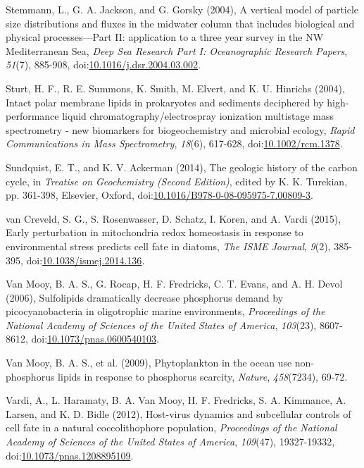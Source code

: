 \begin{singlespace}
{{Stemmann, L., G. A. Jackson, and G. Gorsky (2004), A vertical model of
particle size distributions and fluxes in the midwater column that
includes biological and physical processes---Part II: application to a
three year survey in the NW Mediterranean Sea, \emph{Deep Sea Research
Part I: Oceanographic Research Papers}, \emph{51}(7), 885-908,
doi:\href{http://dx.doi.org/10.1016/j.dsr.2004.03.002}{10.1016/j.dsr.2004.03.002}.

Sturt, H. F., R. E. Summons, K. Smith, M. Elvert, and K. U. Hinrichs
(2004), Intact polar membrane lipids in prokaryotes and sediments
deciphered by high-performance liquid chromatography/electrospray
ionization multistage mass spectrometry - new biomarkers for
biogeochemistry and microbial ecology, \emph{Rapid Communications in Mass Spectrometry}, \emph{18}(6), 617-628, doi:\href{http://dx.doi.org/10.1002/rcm.1378}{10.1002/rcm.1378}.

Sundquist, E. T., and K. V. Ackerman (2014), The geologic history of the carbon cycle, in \emph{Treatise on Geochemistry (Second Edition)}, edited by K. K. Turekian, pp. 361-398, Elsevier, Oxford, doi:\href{http://dx.doi.org/10.1016/B978-0-08-095975-7.00809-3}{10.1016/B978-0-08-095975-7.00809-3}.

van Creveld, S. G., S. Rosenwasser, D. Schatz, I. Koren, and A. Vardi
(2015), Early perturbation in mitochondria redox homeostasis in response
to environmental stress predicts cell fate in diatoms, \emph{The ISME Journal},
\emph{9}(2), 385-395, doi:\href{http://dx.doi.org/10.1038/ismej.2014.136}{10.1038/ismej.2014.136}.

Van Mooy, B. A. S., G. Rocap, H. F. Fredricks, C. T. Evans, and A. H.
Devol (2006), Sulfolipids dramatically decrease phosphorus demand by
picocyanobacteria in oligotrophic marine environments, \emph{Proceedings of the National Academy of Sciences of the United States of America}, \emph{103}(23), 8607-8612, doi:\href{http://dx.doi.org/10.1073/pnas.0600540103}{10.1073/pnas.0600540103}.

Van Mooy, B. A. S., et al. (2009), Phytoplankton in the ocean use
non-phosphorus lipids in response to phosphorus scarcity, \emph{Nature},
\emph{458}(7234), 69-72.

Vardi, A., L. Haramaty, B. A. Van Mooy, H. F. Fredricks, S. A. Kimmance,
A. Larsen, and K. D. Bidle (2012), Host-virus dynamics and subcellular
controls of cell fate in a natural coccolithophore population,
\emph{Proceedings of the National Academy of Sciences of the United
States of America}, \emph{109}(47), 19327-19332,
doi:\href{http://dx.doi.org/10.1073/pnas.1208895109}{10.1073/pnas.1208895109}.

}}
\end{singlespace}
